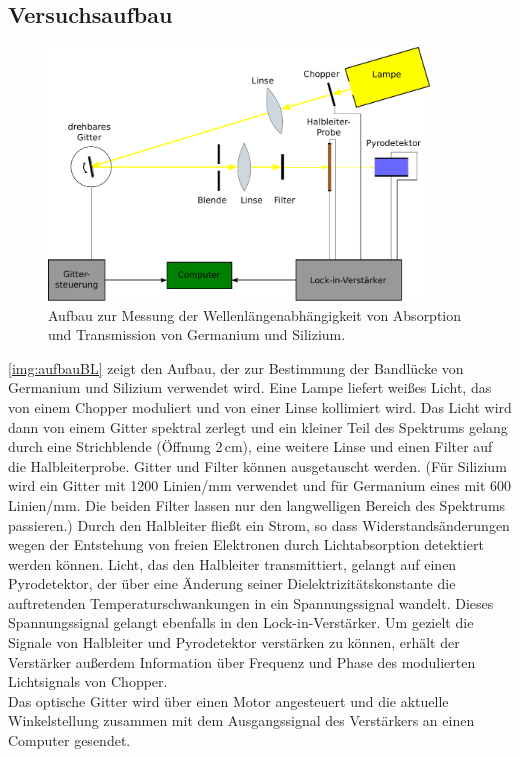 \subsection{Versuchsaufbau}

\begin{figure}[H]
\begin{center}
  \includegraphics[width=0.9\textwidth]{../img/aufbauBL.pdf}
  \caption{Aufbau zur Messung der Wellenlängenabhängigkeit von
  Absorption und Transmission von Germanium und Silizium.}
  \label{img:aufbauBL}
\end{center}
\end{figure}

\autoref{img:aufbauBL} zeigt den Aufbau, der zur Bestimmung der Bandlücke von Germanium und Silizium
verwendet wird.
Eine Lampe liefert weißes Licht,
das von einem Chopper moduliert und von einer Linse kollimiert wird.
Das Licht wird dann von einem Gitter spektral zerlegt und ein kleiner Teil des Spektrums
gelang durch eine Strichblende (Öffnung 2\,cm), eine weitere Linse und einen Filter auf die Halbleiterprobe.
Gitter und Filter können ausgetauscht werden.
(Für Silizium wird ein Gitter mit 1200 Linien/mm verwendet und für
Germanium eines mit 600 Linien/mm.
Die beiden Filter lassen nur den langwelligen Bereich des Spektrums passieren.)
Durch den Halbleiter fließt ein Strom, so dass Widerstandsänderungen wegen der
Entstehung von freien Elektronen durch Lichtabsorption detektiert werden können.
Licht, das den Halbleiter transmittiert,
gelangt auf einen Pyrodetektor, der über eine Änderung seiner Dielektrizitätskonstante die
auftretenden Temperaturschwankungen in ein Spannungssignal wandelt.
Dieses Spannungssignal gelangt ebenfalls in den Lock-in-Verstärker.
Um gezielt die Signale von Halbleiter und Pyrodetektor verstärken zu können,
erhält der Verstärker außerdem Information über Frequenz und Phase des modulierten Lichtsignals von Chopper.\\
Das optische Gitter wird über einen Motor angesteuert und die aktuelle Winkelstellung
zusammen mit dem Ausgangssignal
des Verstärkers an einen Computer gesendet.


